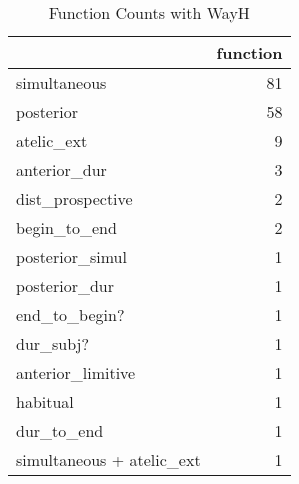 \begin{table}[htbp!]
\centering
\caption{Function Counts with WayH}
\label{table:WayH_fun_ct}
\begin{tabular}{lr}
\toprule
{} &  function \\
\midrule
simultaneous              &        81 \\
posterior                 &        58 \\
atelic\_ext                &         9 \\
anterior\_dur              &         3 \\
dist\_prospective          &         2 \\
begin\_to\_end              &         2 \\
posterior\_simul           &         1 \\
posterior\_dur             &         1 \\
end\_to\_begin?             &         1 \\
dur\_subj?                 &         1 \\
anterior\_limitive         &         1 \\
habitual                  &         1 \\
dur\_to\_end                &         1 \\
simultaneous + atelic\_ext &         1 \\
\bottomrule
\end{tabular}
\end{table}
